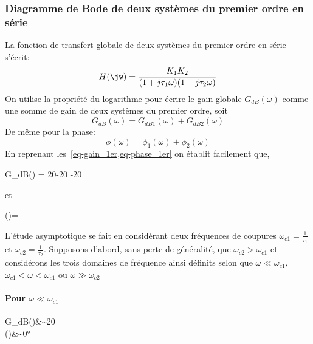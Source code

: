 \subsubsection{Diagramme de Bode de deux systèmes du premier ordre en série }
La fonction de transfert globale de deux systèmes du premier ordre en série 
s'écrit:
\begin{align}
H(\jw)=\dfrac{K_1K_2}{(1+j\tau_1\omega)(1+j\tau_2\omega)}\label{eq-1er_serie}
\end{align}
On utilise la propriété du logarithme pour écrire le gain globale 
$G_{dB}(\omega)$ comme une somme de gain de deux systèmes du premier ordre, 
soit
$$
G_{dB}(\omega) = G_{dB1}(\omega) + G_{dB2}(\omega)
$$
De même pour la phase:
$$
\phi(\omega)= \phi_1(\omega) + \phi_2(\omega)
$$
En reprenant les~\cref{eq-gain_1er,eq-phase_1er} on établit facilement que,
\begin{bequation}
G_{dB}(\omega) = 20-20
                -20
\end{bequation}
et
\begin{bequation}
\phi(\omega)=-\arctan{\tau_1\omega}-\arctan{\tau_2\omega}
\end{bequation}

L'étude asymptotique se fait en considérant deux fréquences de coupures 
$\omega_{c1}=\frac{1}{\tau_1}$ et $\omega_{c2}=\frac{1}{\tau_2}$.
Supposons d'abord, sans perte de généralité, que $\omega_{c2}>\omega_{c1}$ et 
considérons 
les trois domaines de fréquence ainsi définits selon que 
$\omega\ll\omega_{c1}$, $\omega_{c1}<\omega<\omega_{c1}$ ou 
$\omega\gg\omega_{c2}$

\paragraph{Pour $\omega\ll\omega_{c1}$}
\begin{bequation}
G_{dB}(\omega)&\sim20\\
    \phi(\omega)&\sim0\si{\degree}
\end{bequation}

